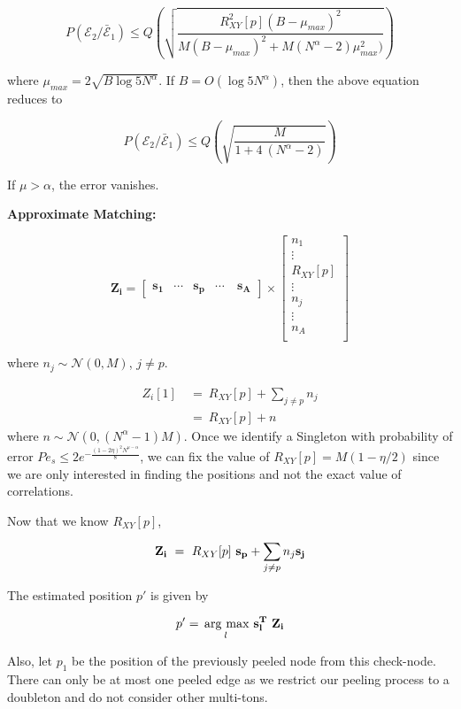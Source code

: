 \[ P(\mathcal{E}_2 / \bar{\mathcal{E}}_1 ) \leq Q \left( \sqrt{\frac{R_{XY}^{2}[p](B-\mu_{max})^2}{M(B-\mu_{max})^2 + M(N^{\alpha}-2)\mu_{max}^2)}} \right) \]
	
	where $\mu_{max} = 2\sqrt{B \log 5 N^{\alpha}} $. If $B = O(\log 5 N^{\alpha})$, then the above equation reduces to

\[ P(\mathcal{E}_2 / \bar{\mathcal{E}}_1 ) \leq Q \left( \sqrt{\frac{M}{1 + 4 ~ (N^{\alpha}-2)}} \right) \]

If $\mu > \alpha$, the error vanishes.


{\bf Approximate Matching:}


\[
\mathbf{Z_i} = \begin{bmatrix}
\mathbf{s_1}       & \cdots   & \mathbf{s_p} &\cdots \ &\mathbf{s_A}
\end{bmatrix} \times
\begin{bmatrix}
n_1 \\
\vdots \\
R_{XY}[p]\\
\vdots\\
n_j \\
\vdots\\
n_{A}\\
\end{bmatrix}
\]


where $n_j \sim \mathcal{N}(0,M)$, $j \neq p$.

\[\begin{array}{ll}
Z_i[1] \ &= \ R_{XY}[p] + \sum_{j \neq p}n_j \\
&= \ R_{XY}[p] + n 
\end{array}
\]
where $n \sim \mathcal{N}(0,(N^\alpha-1)M)$. Once we identify a Singleton with probability of error $Pe_s \leq 2 e^{- \frac{(1-2\eta)^2N^{\mu-\alpha}}{8}}$, we can fix the value of $R_{XY}[p] = M(1-\eta/2)$ since we are only interested in finding the positions and not the exact value of correlations. 

Now that we know $R_{XY}[p]$, 

\[ \mathbf{Z_i} \ = \ R_{XY}[p] ~ \mathbf{s_p}+ \sum_{j \neq p}n_j \mathbf{s_j} \\
\]

The estimated position $p'$ is given by

\[ p' = \underset{l}{\operatorname*{\,arg\ max}}\ \bf s^T_l ~ Z_i\]

Also, let $p_1$ be the position of the previously peeled node from this check-node. There can only be at most one peeled edge as we restrict our peeling process to a doubleton and do not consider other multi-tons.
 
